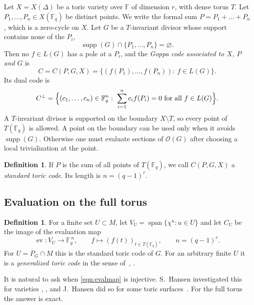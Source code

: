 \documentclass[12pt,letterpaper]{article}
\numberwithin{equation}{section}
\theoremstyle{definition}
\newtheorem{definition}[theorem]{Definition}
\theoremstyle{remark}
\DeclareMathOperator{\supp}{supp}
\DeclareMathOperator{\ev}{ev}
\DeclareMathOperator{\Span}{span}
\newcommand{\F}{\mathbb{F}}
\newcommand{\Fq}{\mathbb{F}_q}
\newcommand{\OO}{\mathcal{O}}
\begin{document}
Let $X=X(\Delta)$ be a toric variety over $\F$ of dimension $r$, with dense
torus $T$. Let $P_1,\dots,P_n\in X(\Fq)$ be distinct points. We write the
formal sum $P=P_1+\dots+P_n$, which is a zero-cycle on $X$. Let $G$ be a
$T$-invariant divisor whose support contains none of the $P_i$,
\[
\supp(G)\cap\{P_1,\dots,P_n\}=\varnothing .
\]
Then no $f\in L(G)$ has a pole at a $P_i$, and the \emph{Goppa code associated
to $X$, $P$ and $G$} is
\begin{equation}\label{eqn:code2}
C=C(P,G,X)=\{(f(P_1),\dots,f(P_n)):\ f\in L(G)\}.
\end{equation}
Its dual code is
\begin{equation}\label{eqn:dualcode}
C^\perp=\Bigl\{(c_1,\dots,c_n)\in\Fq^n:\ \sum_{i=1}^n c_if(P_i)=0\ \text{for all}\
f\in L(G)\Bigr\}.
\end{equation}
A $T$-invariant divisor is supported on the boundary $X\setminus T$, so every
point of $T(\Fq)$ is allowed. A point on the boundary can be used only when
it avoids $\supp(G)$. Otherwise one must evaluate sections of $\OO(G)$ after
choosing a local trivialization at the point.

\begin{definition}\label{def:standard}
If $P$ is the sum of all points of $T(\Fq)$, we call $C(P,G,X)$ a
\emph{standard toric code}. Its length is $n=(q-1)^r$.
\end{definition}

\subsection{Evaluation on the full torus}

\begin{definition}\label{def:CU}
For a finite set $U\subset M$, let $V_U=\Span\{\chi^u: u\in U\}$ and let $C_U$
be the image of the evaluation map
\begin{equation}\label{eqn:evalmap}
\ev:V_U\to\Fq^{\,n},\qquad f\mapsto(f(t))_{t\in T(\Fq)},\qquad n=(q-1)^r .
\end{equation}
For $U=P_G\cap M$ this is the standard toric code of $G$. For an arbitrary
finite $U$ it is a \emph{generalized toric code} in the sense
of~\cite{Ru09}, \cite{Li11}.
\end{definition}

It is natural to ask when \eqref{eqn:evalmap} is injective. S.~Hansen
investigated this for varieties \cite[\S5.3]{SH99}, \cite{SH96}, and
J.~Hansen did so for some toric surfaces~\cite[\S2.3]{Ha02}. For the full
torus the answer is exact.
\end{document}
